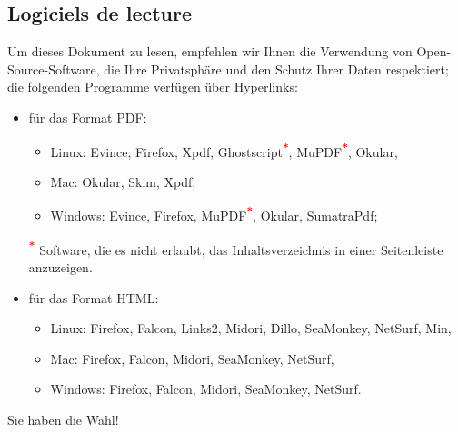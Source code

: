 {\subsection{Logiciels de lecture\label{introduction-manual-readers}}

Um dieses Dokument zu lesen, empfehlen wir Ihnen die Verwendung von Open-Source-Software, die Ihre Privatsphäre und den Schutz Ihrer Daten respektiert; die folgenden Programme verfügen über \gls{Hyperlinks}: 
\begin{itemize}
	\item für das Format \gls{PDF}:%
		\begin{itemize}
			\item[\textopenbullet] Linux: Evince, Firefox, Xpdf, Ghostscript\textsuperscript{\textcolor{red}{\textbf{*}}}, MuPDF\textsuperscript{\textcolor{red}{\textbf{*}}}, Okular,
			\item[\textopenbullet] Mac: Okular, Skim, Xpdf,
			\item[\textopenbullet] Windows: Evince, Firefox, MuPDF\textsuperscript{\textcolor{red}{\textbf{*}}}, Okular, SumatraPdf;
		\end{itemize}
		\textsuperscript{\textcolor{red}{\textbf{*}}} Software, die es nicht erlaubt, das Inhaltsverzeichnis in einer Seitenleiste anzuzeigen.%
	\item für das Format \gls{HTML}:%
		\begin{itemize}
			\item[\textopenbullet] Linux: Firefox, Falcon, Links2, Midori, Dillo, SeaMonkey, NetSurf, Min,
			\item[\textopenbullet] Mac: Firefox, Falcon, Midori, SeaMonkey, NetSurf,
			\item[\textopenbullet] Windows: Firefox, Falcon, Midori, SeaMonkey, NetSurf.
		\end{itemize}
\end{itemize}

Sie haben die Wahl!%

}
